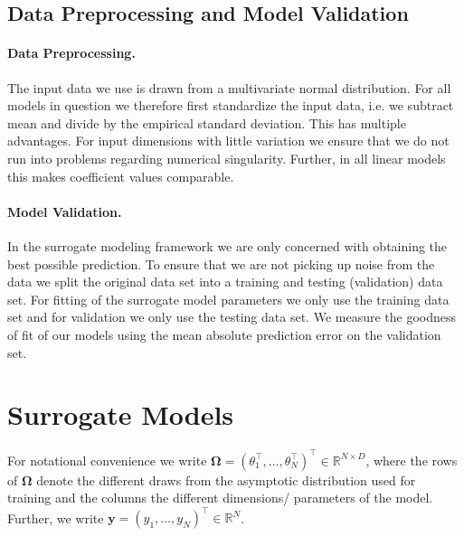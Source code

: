 \documentclass[a4paper, 12pt]{article}
\begin{document}
\subsection{Data Preprocessing and Model Validation}

\paragraph{Data Preprocessing.}

The input data we use is drawn from a multivariate normal distribution.
For all models in question we therefore first standardize the input data, i.e. we subtract mean and divide by the empirical standard deviation.
This has multiple advantages.
For input dimensions with little variation we ensure that we do not run into problems regarding numerical singularity.
Further, in all linear models this makes coefficient values comparable.

\paragraph{Model Validation.}

In the surrogate modeling framework we are only concerned with obtaining the best possible prediction.
To ensure that we are not picking up noise from the data we split the original data set into a training and testing (validation) data set.
For fitting of the surrogate model parameters we only use the training data set and for validation we only use the testing data set.
We measure the goodness of fit of our models using the mean absolute prediction error on the validation set.


\section{Surrogate Models}

For notational convenience we write $\bm{\Omega} = (\theta_1^\top, \dots, \theta_N^\top)^\top \in \mathbb{R}^{N \times D}$, where the rows of $\bm{\Omega}$ denote the different draws from the asymptotic distribution used for training and the columns the different dimensions/ parameters of the model.
Further, we write $\mathbf{y} = (y_1, \dots, y_N)^\top \in \mathbb{R}^N$.%
\end{document}
